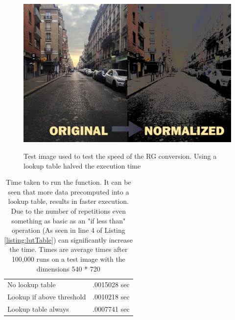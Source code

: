 \begin{multicols}{2}
	\begin{figure}[H]
	\includegraphics[width=1\linewidth]{figure/Analysis/Normalized.png}
	\label{rgConversion}
	\caption{Test image used to test the speed of the  RG conversion. Using a lookup table halved the execution time}
	\end{figure}

    \columnbreak
	\begin{table}[H]
		\centering
		\caption{Time taken to run the function. It can be seen that more data precomputed into a lookup table, results in faster execution. Due to the number of repetitions even something as basic as an "if less than" operation (As seen in line 4 of Listing \ref{listing:lutTable}) can significantly increase the time. Times are average times after 100,000 runs on a test image with the dimensions 540 * 720}
		\begin{tabular}{ l | l }
			\hline			
			No lookup table & .0015028 sec\\
			Lookup if above threshold & .0010218 sec\\
			Lookup table always& .0007741 sec\\
			\hline 
		\end{tabular}
	\label{table:rgConvSpeed}
	\end{table}
\end{multicols}
